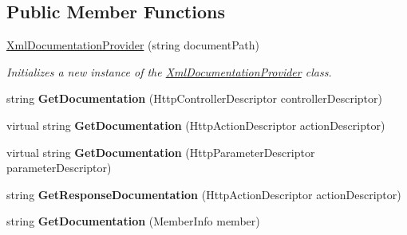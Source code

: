 \subsection*{Public Member Functions}
\begin{DoxyCompactItemize}
\item 
\hyperlink{class_wis_r_rest_a_p_i_1_1_areas_1_1_help_page_1_1_xml_documentation_provider_aeb73b8b8b12e5b6d7c067b43d9e1fe14}{Xml\+Documentation\+Provider} (string document\+Path)
\begin{DoxyCompactList}\small\item\em Initializes a new instance of the \hyperlink{class_wis_r_rest_a_p_i_1_1_areas_1_1_help_page_1_1_xml_documentation_provider}{Xml\+Documentation\+Provider} class. \end{DoxyCompactList}\item 
\hypertarget{class_wis_r_rest_a_p_i_1_1_areas_1_1_help_page_1_1_xml_documentation_provider_a4b606b760cdaa38601088063a8364da8}{}string {\bfseries Get\+Documentation} (Http\+Controller\+Descriptor controller\+Descriptor)\label{class_wis_r_rest_a_p_i_1_1_areas_1_1_help_page_1_1_xml_documentation_provider_a4b606b760cdaa38601088063a8364da8}

\item 
\hypertarget{class_wis_r_rest_a_p_i_1_1_areas_1_1_help_page_1_1_xml_documentation_provider_a5afaa38fb858ed215beadadde63eb19c}{}virtual string {\bfseries Get\+Documentation} (Http\+Action\+Descriptor action\+Descriptor)\label{class_wis_r_rest_a_p_i_1_1_areas_1_1_help_page_1_1_xml_documentation_provider_a5afaa38fb858ed215beadadde63eb19c}

\item 
\hypertarget{class_wis_r_rest_a_p_i_1_1_areas_1_1_help_page_1_1_xml_documentation_provider_ab34be5e62ef8592b80a26aae25f9ce7c}{}virtual string {\bfseries Get\+Documentation} (Http\+Parameter\+Descriptor parameter\+Descriptor)\label{class_wis_r_rest_a_p_i_1_1_areas_1_1_help_page_1_1_xml_documentation_provider_ab34be5e62ef8592b80a26aae25f9ce7c}

\item 
\hypertarget{class_wis_r_rest_a_p_i_1_1_areas_1_1_help_page_1_1_xml_documentation_provider_ae1e4bab1aef8571eec41890a6635158a}{}string {\bfseries Get\+Response\+Documentation} (Http\+Action\+Descriptor action\+Descriptor)\label{class_wis_r_rest_a_p_i_1_1_areas_1_1_help_page_1_1_xml_documentation_provider_ae1e4bab1aef8571eec41890a6635158a}

\item 
\hypertarget{class_wis_r_rest_a_p_i_1_1_areas_1_1_help_page_1_1_xml_documentation_provider_a46432be1ee7ecbb6d4143326b93cebe7}{}string {\bfseries Get\+Documentation} (Member\+Info member)\label{class_wis_r_rest_a_p_i_1_1_areas_1_1_help_page_1_1_xml_documentation_provider_a46432be1ee7ecbb6d4143326b93cebe7}


\end{DoxyCompactItemize}
